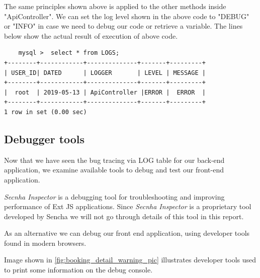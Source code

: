 The same principles shown above is applied to the other methods inside "ApiController". We can set the log level shown in the above code to "DEBUG" or "INFO" in case we need to debug our code or retrieve a variable. The lines below show the actual result of execution of above code.

\begin{verbatim}
    mysql >  select * from LOGS;
+--------+------------+--------------+-------+---------+
| USER_ID| DATED      | LOGGER       | LEVEL | MESSAGE |
+--------+------------+--------------+-------+---------+
|  root  | 2019-05-13 | ApiController |ERROR |  ERROR  |
+--------+------------+--------------+-------+---------+
1 row in set (0.00 sec)
\end{verbatim}


\subsection{Debugger tools}
Now that we have seen the bug tracing via LOG table for our back-end application, we examine available tools to debug and test our front-end application. 

\textit{Secnha Inspector} is a debugging tool for troubleshooting and improving performance of Ext JS applications. Since \textit{Secnha Inspector} is a proprietary tool developed by Sencha we will not go through details of this tool in this report.

As an alternative we can debug our front end application, using developer tools found in modern browsers.

Image shown in \ref{fig:booking_detail_warning_pic} illustrates developer tools used to print some information on the debug console. 

